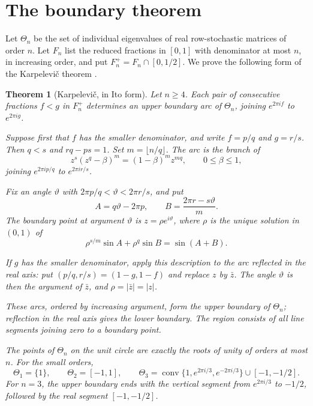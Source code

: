 \documentclass[11pt,a4paper]{article}
\DeclareMathOperator{\conv}{conv}
\newtheorem{theorem}{Theorem}[section]
\theoremstyle{definition}
\theoremstyle{remark}
\numberwithin{equation}{section}
\begin{document}
\section{The boundary theorem}
Let $\Theta_n$ be the set of individual eigenvalues of real row-stochastic matrices of order $n$. Let $F_n$ list the reduced fractions in $[0,1]$ with denominator at most $n$, in increasing order, and put $F_n^+=F_n\cap[0,1/2]$. We prove the following form of the Karpelevi\v{c} theorem \cite{Karp,Ito}.

\begin{theorem}[Karpelevi\v{c}, in Ito form]\label{thm:karpelevic}
Let $n\ge4$. Each pair of consecutive fractions $f<g$ in $F_n^+$
determines an upper boundary arc of $\Theta_n$, joining $e^{2\pi if}$
to $e^{2\pi ig}$.

Suppose first that $f$ has the smaller denominator, and write
$f=p/q$ and $g=r/s$. Then $q<s$ and $rq-ps=1$.
Set $m=\lfloor n/q\rfloor$. The arc is the branch of
\begin{equation}\label{eq:main-ito}
 z^s(z^q-\beta)^m=(1-\beta)^m z^{mq},
 \qquad 0\le\beta\le1,
\end{equation}
joining $e^{2\pi ip/q}$ to $e^{2\pi ir/s}$.

Fix an angle $\vartheta$ with $2\pi p/q<\vartheta<2\pi r/s$, and put
\[
 A=q\vartheta-2\pi p,\qquad
 B=\frac{2\pi r-s\vartheta}{m}.
\]
The boundary point at argument $\vartheta$ is $z=\rho e^{i\vartheta}$,
where $\rho$ is the unique solution in $(0,1)$ of
\[
 \rho^{s/m}\sin A+\rho^q\sin B=\sin(A+B).
\]

If $g$ has the smaller denominator, apply this description to the
arc reflected in the real axis: put $(p/q,r/s)=(1-g,1-f)$ and
replace $z$ by $\bar z$. The angle $\vartheta$ is then the argument
of $\bar z$, and $\rho=|\bar z|=|z|$.

These arcs, ordered by increasing argument, form the upper boundary
of $\Theta_n$; reflection in the real axis gives the lower boundary.
The region consists of all line segments joining zero to a boundary point.

The points of $\Theta_n$ on the unit circle are exactly the roots of
unity of orders at most $n$. For the small orders,
\[
 \Theta_1=\{1\},\qquad \Theta_2=[-1,1],\qquad
 \Theta_3=\conv\{1,e^{2\pi i/3},e^{-2\pi i/3}\}\cup[-1,-1/2].
\]
For $n=3$, the upper boundary ends with the vertical segment from
$e^{2\pi i/3}$ to $-1/2$, followed by the real segment $[-1,-1/2]$.
\end{theorem}
\end{document}

